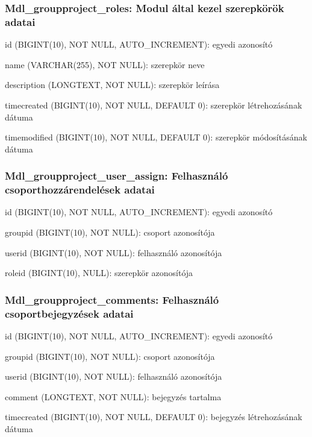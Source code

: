 \subsubsection{ \textbf{Mdl\_groupproject\_roles: Modul által kezel szerepkörök adatai}}
\begin{compactitem}
	\item id (BIGINT(10), NOT NULL, AUTO\_INCREMENT): egyedi azonosító
    \item name (VARCHAR(255), NOT NULL): szerepkör neve
    \item description (LONGTEXT, NOT  NULL): szerepkör leírása
    \item timecreated (BIGINT(10), NOT NULL, DEFAULT 0): szerepkör létrehozásának dátuma
    \item timemodified (BIGINT(10), NOT NULL, DEFAULT 0): szerepkör módosításának dátuma
 \end{compactitem} 

\subsubsection{  \textbf{Mdl\_groupproject\_user\_assign: Felhasználó csoporthozzárendelések adatai}}
\begin{compactitem}
	\item id (BIGINT(10), NOT NULL, AUTO\_INCREMENT): egyedi azonosító
    \item groupid (BIGINT(10), NOT NULL): csoport azonosítója
    \item userid (BIGINT(10), NOT NULL): felhasználó azonosítója
    \item roleid (BIGINT(10),  NULL): szerepkör azonosítója
 \end{compactitem} 

\subsubsection{{\textbf{Mdl\_groupproject\_comments: Felhasználó csoportbejegyzések adatai}}}
\begin{compactitem}
	\item id (BIGINT(10), NOT NULL, AUTO\_INCREMENT): egyedi azonosító
    \item groupid (BIGINT(10), NOT NULL): csoport azonosítója
    \item userid (BIGINT(10), NOT NULL): felhasználó azonosítója
    \item comment (LONGTEXT, NOT NULL): bejegyzés tartalma
    \item timecreated (BIGINT(10), NOT NULL, DEFAULT 0): bejegyzés létrehozásának dátuma
 \end{compactitem} 

